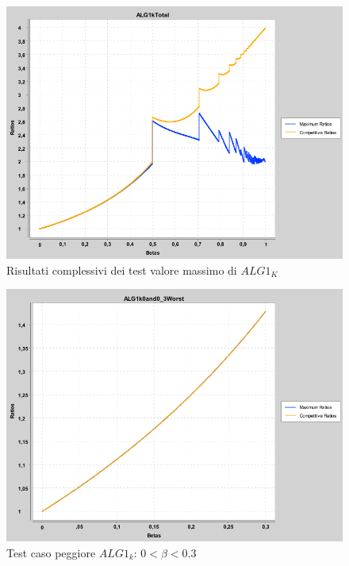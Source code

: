 \documentclass[12pt]{article}
\begin{document}
\begin{figure}[H]
\caption{Risultati complessivi dei test valore massimo di $ALG1_{K}$}
\centering
\includegraphics[scale=0.4]{max/ALG1kTotal.png}
\end{figure}
\begin{figure}[H]
\caption{Test caso peggiore $ALG1_{k}$: $0 < \beta < 0.3$}
\centering
\includegraphics[scale=0.4]{max/ALG1k0and0_3Worst.png}
\end{figure}
\end{document}
